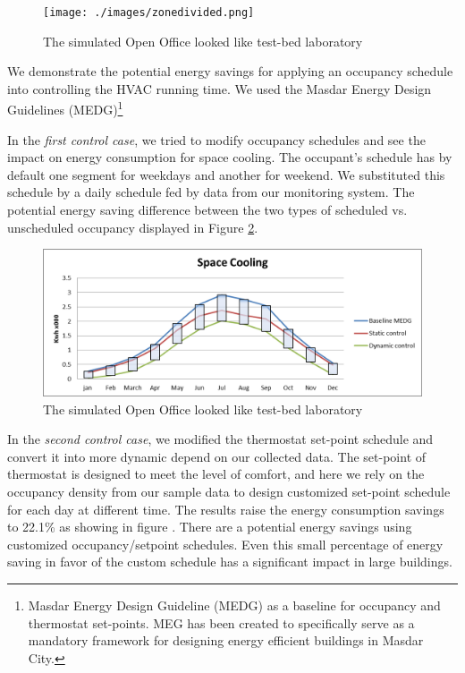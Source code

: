 \begin{figure}[!ht]
  \centering
 	  	\texttt{[image: ./images/zonedivided.png]}
  \caption{The simulated Open Office looked like test-bed laboratory}\label{fig:simdesign}
\end{figure}


We demonstrate the potential energy savings for applying an occupancy schedule into controlling the HVAC running time. We used the Masdar Energy Design Guidelines (MEDG)\footnote{Masdar Energy Design Guideline (MEDG) as a baseline for occupancy and thermostat set-points. MEG has been created to specifically serve as a mandatory framework for designing energy efficient buildings in Masdar City.}

In the {\em first control case}, we tried to modify occupancy schedules and see the impact on energy consumption for space cooling.  The occupant's schedule  has by default one segment for weekdays and another for weekend. We substituted this schedule by a daily schedule  fed by data from our monitoring system. The potential energy saving difference between the two types of  scheduled  vs. unscheduled occupancy displayed in Figure \ref{fig:engsav}.

\begin{figure}[!ht]
  \centering
 	  	\includegraphics[width=0.9\columnwidth]{./images/sc.png}
  \caption{The simulated Open Office looked like test-bed laboratory}\label{fig:engsav}
\end{figure}

In the {\em second control case}, we modified the thermostat set-point schedule and convert it into more dynamic depend on our collected data. The set-point of thermostat is designed to meet the level of comfort, and here we rely on the occupancy density from our sample data to design customized set-point schedule for each day at different time. The results raise the energy consumption savings to 22.1\% as showing in figure  . There are a potential energy savings using customized occupancy/setpoint schedules. Even this small percentage of energy saving in favor of the custom schedule has a significant impact in large buildings. 


